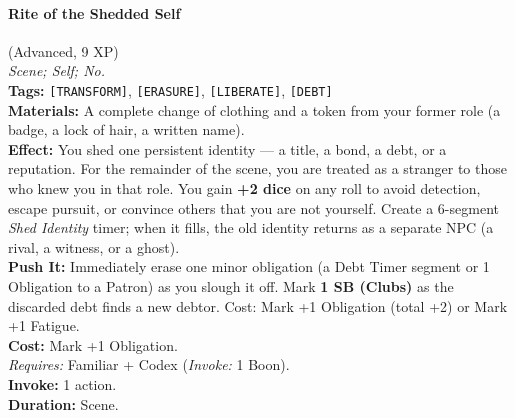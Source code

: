 \paragraph{Rite of the Shedded Self} (Advanced, 9 XP) \hfill \\
\emph{Scene; Self; No.} \\
\textbf{Tags:} \texttt{[TRANSFORM]}, \texttt{[ERASURE]}, \texttt{[LIBERATE]}, \texttt{[DEBT]} \\
\textbf{Materials:} A complete change of clothing and a token from your former role (a badge, a lock of hair, a written name). \\
\textbf{Effect:} You shed one persistent identity --- a title, a bond, a debt, or a reputation. For the remainder of the scene, you are treated as a stranger to those who knew you in that role. You gain \textbf{+2 dice} on any roll to avoid detection, escape pursuit, or convince others that you are not yourself. Create a 6-segment \textit{Shed Identity} timer; when it fills, the old identity returns as a separate NPC (a rival, a witness, or a ghost). \\
\textbf{Push It:} Immediately erase one minor obligation (a Debt Timer segment or 1 Obligation to a Patron) as you slough it off. Mark \textbf{1 SB (Clubs)} as the discarded debt finds a new debtor. Cost: Mark +1 Obligation (total +2) or Mark +1 Fatigue. \\
\textbf{Cost:} Mark +1 Obligation. \\
\textit{Requires:} Familiar + Codex (\textit{Invoke:} 1 Boon). \\
\textbf{Invoke:} 1 action. \\
\textbf{Duration:} Scene.


